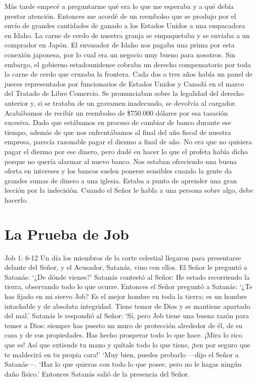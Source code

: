 \documentclass[twoside, 12pt]{book}
\begin{document}
Más tarde empecé a preguntarme qué era lo que me esperaba y a qué debía prestar atención. Entonces me acordé de un reembolso que se produjo por el envío de grandes cantidades de ganado a los Estados Unidos a una empacadora en Idaho. La carne de cerdo de nuestra granja se empaquetaba y se enviaba a un comprador en Japón. El envasador de Idaho nos pagaba una prima por esta conexión japonesa, por lo cual era un negocio muy bueno para nosotros. Sin embargo, el gobierno estadounidense cobraba un derecho compensatorio por toda la carne de cerdo que cruzaba la frontera. Cada dos o tres años había un panel de jueces representados por funcionarios de Estados Unidos y Canadá en el marco del Tratado de Libre Comercio. Se pronunciaban sobre la legalidad del derecho anterior y, si se trataba de un gravamen inadecuado, se devolvía al cargador. Acabábamos de recibir un reembolso de \$750.000 dólares por esa tasación excesiva. Dado que estábamos en proceso de cambiar de banco durante ese tiempo, además de que nos enfrentábamos al final del año fiscal de nuestra empresa, parecía razonable pagar el diezmo a final de año. No era que no quisiera pagar el diezmo por ese dinero, pero dudé en hacer lo que el profeta había dicho porque no quería alarmar al nuevo banco. Nos estaban ofreciendo una buena oferta en intereses y los bancos suelen ponerse sensibles cuando la gente da grandes sumas de dinero a una iglesia. Estaba a punto de aprender una gran lección por la indecisión. Cuando el Señor le habla a una persona sobre algo, debe hacerlo.\\
 
\section{La Prueba de Job}

Job 1: 6-12 Un día los miembros de la corte celestial llegaron para presentarse delante del Señor, y el Acusador, Satanás, vino con ellos. El Señor le preguntó a Satanás: ‘¿De dónde vienes?’ Satanás contestó al Señor: He estado recorriendo la tierra, observando todo lo que ocurre. Entonces el Señor preguntó a Satanás: ‘¿Te has fijado en mi siervo Job? Es el mejor hombre en toda la tierra; es un hombre intachable y de absoluta integridad. Tiene temor de Dios y se mantiene apartado del mal.’ Satanás le respondió al Señor: ‘Sí, pero Job tiene una buena razón para temer a Dios: siempre has puesto un muro de protección alrededor de él, de su casa y de sus propiedades. Has hecho prosperar todo lo que hace. ¡Mira lo rico que es! Así que extiende tu mano y quítale todo lo que tiene, ¡ten por seguro que te maldecirá en tu propia cara!’ ‘Muy bien, puedes probarlo —dijo el Señor a Satanás—. ‘Haz lo que quieras con todo lo que posee, pero no le hagas ningún daño físico.’ Entonces Satanás salió de la presencia del Señor.\\
\end{document}
